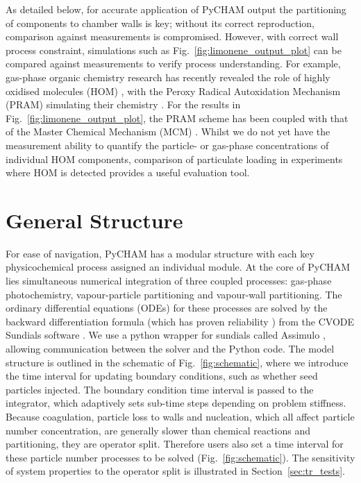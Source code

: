 \documentclass[gmd, manuscript]{copernicus}
\begin{document}
As detailed below, for accurate application of PyCHAM output the partitioning of components to chamber walls is key; without its correct reproduction, comparison against measurements is compromised.  However, with correct wall process constraint, simulations such as Fig.~\ref{fig:limonene_output_plot} can be compared against measurements to verify process understanding.  For example, gas-phase organic chemistry research has recently revealed the role of highly oxidised molecules (HOM) \citep{Ehn2014}, with the Peroxy Radical Autoxidation Mechanism (PRAM) simulating their chemistry \citep{Roldin2019}.  For the results in Fig.~\ref{fig:limonene_output_plot}, the PRAM scheme has been coupled with that of the Master Chemical Mechanism (MCM) \citep{Jenkin1997, Saunders2003}.  Whilst we do not yet have the measurement ability to quantify the particle- or gas-phase concentrations of individual HOM components, comparison of particulate loading in experiments where HOM is detected provides a useful evaluation tool.

\section{General Structure}\label{sec:general}

For ease of navigation, PyCHAM has a modular structure with each key physicochemical process assigned an individual module.  At the core of PyCHAM lies simultaneous numerical integration of three coupled processes: gas-phase photochemistry, vapour-particle partitioning and vapour-wall partitioning.  The ordinary differential equations (ODEs) for these processes are solved by the backward differentiation formula (which has proven reliability \citep{Jacobson2005}) from the CVODE Sundials software \citep{hindmarsh2005sundials}.  We use a python wrapper for sundials called Assimulo \citep{Andersson2015}, allowing communication between the solver and the Python code.  The model structure is outlined in the schematic of Fig.~\ref{fig:schematic}, where we introduce the time interval for updating boundary conditions, such as whether seed particles injected.  The boundary condition time interval is passed to the integrator, which adaptively sets sub-time steps depending on problem stiffness.  Because coagulation, particle loss to walls and nucleation, which all affect particle number concentration, are generally slower than chemical reactions and partitioning, they are operator split.  Therefore users also set a time interval for these particle number processes to be solved (Fig.~\ref{fig:schematic}).  The sensitivity of system properties to the operator split is illustrated in Section~\ref{sec:tr_tests}. 
 
\end{document}
